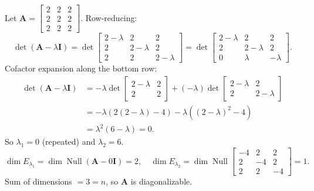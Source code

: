 \begin{example}
  Let $\mathbf{A} =
    \begin{bmatrix}
      2 & 2 & 2 \\
      2 & 2 & 2 \\
      2 & 2 & 2
    \end{bmatrix}
  $. Row-reducing:
  \[
    \det(\mathbf{A} - \lambda \mathbf{I})
    = \det
    \begin{bmatrix}
      2 - \lambda & 2           & 2           \\
      2           & 2 - \lambda & 2           \\
      2           & 2           & 2 - \lambda
    \end{bmatrix}
    = \det
    \begin{bmatrix}
      2 - \lambda & 2           & 2        \\
      2           & 2 - \lambda & 2        \\
      0           & \lambda     & -\lambda
    \end{bmatrix}
    .
  \]
  Cofactor expansion along the bottom row:
  \begin{align*}
    \det(\mathbf{A} - \lambda \mathbf{I})
     & = -\lambda \det
    \begin{bmatrix}
      2 - \lambda & 2 \\
      2           & 2
    \end{bmatrix}
    + (-\lambda) \det
    \begin{bmatrix}
      2 - \lambda & 2           \\
      2           & 2 - \lambda
    \end{bmatrix}
    \\
     & = -\lambda (2(2-\lambda) - 4) - \lambda ((2-\lambda)^2 - 4) \\
     & = \lambda^2 (6 - \lambda) = 0.
  \end{align*}
  So $\lambda_1 = 0$ (repeated) and $\lambda_2 = 6$.
  \[
    \dim E_{\lambda_1} = \dim \operatorname{Null}(\mathbf{A} - 0\mathbf{I}) = 2,
    \quad
    \dim E_{\lambda_2} = \dim \operatorname{Null}
    \begin{bmatrix}
      -4 & 2  & 2  \\
      2  & -4 & 2  \\
      2  & 2  & -4
    \end{bmatrix}
    = 1.
  \]
  Sum of dimensions $= 3 = n$, so $\mathbf{A}$ is diagonalizable.
\end{example}

